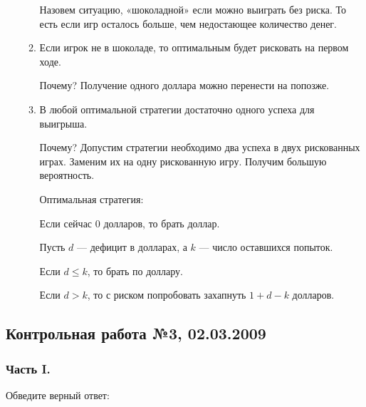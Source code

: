 \begin{enumerate}
\begin{enumerate}
Назовем ситуацию, «шоколадной» если можно выиграть без риска. То есть если игр осталось больше, чем недостающее количество денег.
\item Если игрок не в шоколаде, то оптимальным будет рисковать на первом ходе.

Почему? Получение одного доллара можно перенести на попозже.
\item В любой оптимальной стратегии достаточно одного успеха для выигрыша.

Почему? Допустим стратегии необходимо два успеха в двух рискованных играх. Заменим их  на одну рискованную игру. Получим большую вероятность.

Оптимальная стратегия:

Если сейчас 0 долларов, то брать доллар.

Пусть $d$ — дефицит в долларах, а $k$ — число оставшихся попыток.

Если $d\le k$, то брать по доллару.

Если $d>k$, то с риском попробовать захапнуть $1+d-k$ долларов.
\end{enumerate}
\end{enumerate}



\subsection{Контрольная работа №3, 02.03.2009}

\subsubsection*{Часть I.}

Обведите верный ответ:

